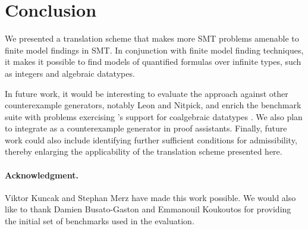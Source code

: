 
%
%
%

\section{Conclusion}
\label{sec:conclusion}

We presented a translation scheme that makes more SMT problems amenable to
finite model findings in SMT. In conjunction with finite model finding
techniques,
it makes it possible to
find models of quantified formulas over infinite types, such as integers
and algebraic datatypes.

In future work, it would be interesting to evaluate the approach against other
counterexample generators, notably Leon and Nitpick, and enrich the benchmark
suite with problems exercising \cvc's support for coalgebraic datatypes
\cite{reynolds-blanchette-2015-codata}. We also plan to integrate \cvc as a
counterexample generator in proof assistants. Finally, future work could also
include identifying further sufficient conditions for admissibility, thereby
enlarging the applicability of the translation scheme presented here.


{%
\def\ackname{Acknowledgment}
\paragraph{%
\ackname.}
Viktor Kuncak and Stephan Merz have made this work possible. We would also like
to thank Damien Busato-Gaston and Emmanouil Koukoutos for providing the initial
set of benchmarks used in the evaluation.
}

{


}



